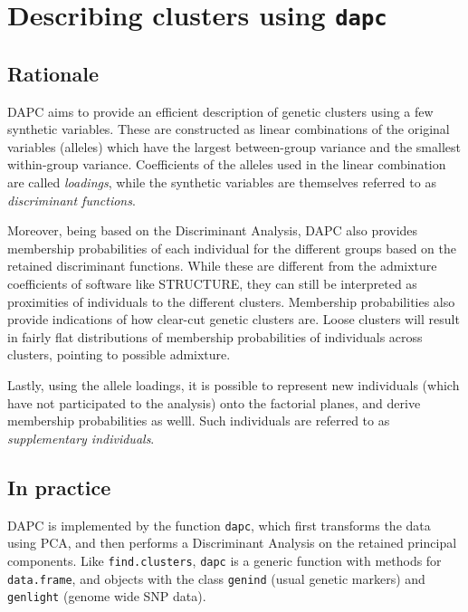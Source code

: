 \documentclass{article}
\newcommand{\code}[1]{{{\tt #1}}}
\begin{document}
\section{Describing clusters using \code{dapc}}


\subsection{Rationale}
DAPC aims to provide an efficient description of genetic clusters using a few synthetic variables.
These are constructed as linear combinations of the original variables (alleles) which have the
largest between-group variance and the smallest within-group variance. Coefficients of the alleles
used in the linear combination are called \textit{loadings}, while the synthetic variables are
themselves referred to as \textit{discriminant functions}.

Moreover, being based on the Discriminant Analysis, DAPC also provides membership probabilities of
each individual for the different groups based on the retained discriminant functions. While these
are different from the admixture coefficients of software like STRUCTURE, they can still be
interpreted as proximities of individuals to the different clusters. Membership
probabilities also provide indications of how clear-cut genetic clusters are. Loose clusters will
result in fairly flat distributions of membership probabilities of individuals across clusters,
pointing to possible admixture.

Lastly, using the allele loadings, it is possible to represent new individuals (which have not participated to the analysis)
onto the factorial planes, and derive membership probabilities as welll. Such individuals are
referred to as \textit{supplementary individuals}.



\subsection{In practice}

DAPC is implemented by the function \texttt{dapc}, which first transforms the data using PCA, and
then performs a Discriminant Analysis on the retained principal components. Like
\texttt{find.clusters}, \texttt{dapc} is a generic function with methods for \texttt{data.frame}, and objects with
the class \texttt{genind} (usual genetic markers) and \texttt{genlight} (genome wide SNP data).
\end{document}

